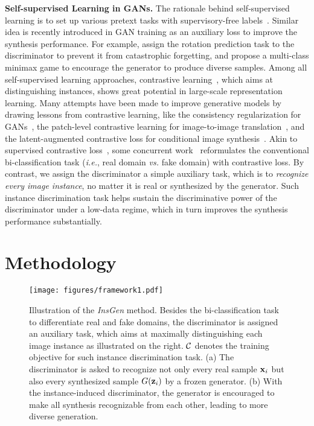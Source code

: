 \documentclass{article}
\begin{document}
\textbf{Self-supervised Learning in GANs.}
The rationale behind self-supervised learning is to set up various pretext tasks with supervisory-free labels~\cite{donahue2019large, chen2020generative, xu2021generative, zhang2016colorful,doersch2015unsupervised, oord2018representation, pathak2016context, yang2021insloc, pathak2016context, gidaris2018unsupervised, noroozi2016unsupervised, pathak2017learning}.
Similar idea is recently introduced in GAN training as an auxiliary loss to improve the synthesis performance.
For example, \citet{chen2019self} assign the rotation prediction task to the discriminator to prevent it from catastrophic forgetting, and \citet{tran2019self} propose a multi-class minimax game to encourage the generator to produce diverse samples.
Among all self-supervised learning approaches, contrastive learning~\cite{wu2018unsupervised, he2019momentum, chen2020simple, henaff2020data, bachman2019learning}, which aims at distinguishing instances, shows great potential in large-scale representation learning.
Many attempts have been made to improve generative models by drawing lessons from contrastive learning, like the consistency regularization for GANs~\cite{zhang2019consistency, zhao2020improved}, the patch-level contrastive learning for image-to-image translation~\cite{park2020contrastive}, and the latent-augmented contrastive loss for conditional image synthesis~\cite{liu2021divco}.
Akin to supervised contrastive loss~\cite{khosla2020supervised}, some concurrent work~\cite{jeong2021training, kang2020contragan, yu2021dual} reformulates the conventional bi-classification task (\textit{i.e.}, real domain \textit{vs.} fake domain) with contrastive loss.
By contrast, we assign the discriminator a simple auxiliary task, which is to \textit{recognize every image instance}, no matter it is real or synthesized by the generator.
Such instance discrimination task helps sustain the discriminative power of the discriminator under a low-data regime, which in turn improves the synthesis performance substantially.


\section{Methodology}\label{sec:method}


\begin{figure}[t]
	\centering
	\texttt{[image: figures/framework1.pdf]}
	\vspace{-15pt}
	\caption{
	    Illustration of the \textit{InsGen} method.
Besides the bi-classification task to differentiate real and fake domains, the discriminator is assigned an auxiliary task, which aims at maximally distinguishing each image instance as illustrated on the right.
${\mathcal{C}}$ denotes the training objective for such instance discrimination task.
(a) The discriminator is asked to recognize not only every real sample ${\rm\bf x}_i$ but also every synthesized sample $G({\rm\bf z}_i)$ by a frozen generator.
(b) With the instance-induced discriminator, the generator is encouraged to make all synthesis recognizable from each other, leading to more diverse generation.
	}
    \label{fig:framework}
    \vspace{0pt}
\end{figure}
\end{document}
